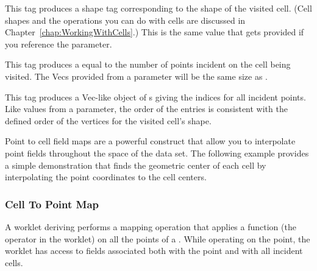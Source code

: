 \begin{description}
  \numericexecutionsignaturetags

\item[\sigtag{CellShape}] This tag produces a shape tag corresponding to
  the shape of the visited cell. (Cell shapes and the operations you can do
  with cells are discussed in
  Chapter~\ref{chap:WorkingWithCells}.) This is the
  same value that gets provided if you reference the
   parameter.

\item[\sigtag{PointCount}] This tag produces a  equal to
  the number of points incident on the cell being visited. The Vecs
  provided from a  parameter will be the same
  size as .

\item[\sigtag{PointIndices}] This tag produces a Vec-like object of
  s giving the indices for all incident points. Like values from a
   parameter, the order of the entries is
  consistent with the defined order of the vertices for the visited cell's
  shape.

  \commonexecutionsignaturetags
\end{description}

Point to cell field maps are a powerful construct that allow you to
interpolate point fields throughout the space of the data set. The
following example provides a simple demonstration that finds the geometric
center of each cell by interpolating the point coordinates to the cell
centers.



\subsubsection{Cell To Point Map}
\label{sec:WorkletMapCellToPoint}


A worklet deriving  performs a mapping
operation that applies a function (the operator in the worklet) on all the
points of a . While operating on the point, the
worklet has access to fields associated both with the point and with all
incident cells.


